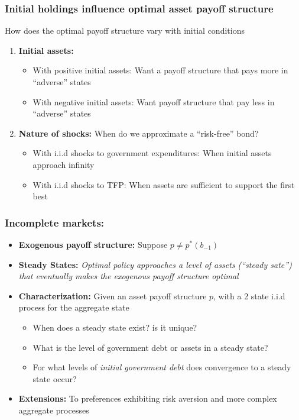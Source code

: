 \documentclass{beamer}
\begin{document}
  \begin{frame}
   \frametitle{Initial holdings influence optimal asset payoff structure}
How does the optimal payoff structure vary with initial conditions
\begin{enumerate}
\item \textbf{Initial assets: }
\begin{itemize}

 \item With positive initial assets: Want a payoff structure that pays more in ``adverse'' states
 \item With negative initial assets: Want payoff structure that pay less in ``adverse'' states
\end{itemize}

 \item \textbf{Nature of shocks: } When do we approximate a ``risk-free'' bond?
 \begin{itemize}
  \item With i.i.d shocks to government expenditures: When initial assets approach  infinity
  \item With i.i.d  shocks to  TFP: When assets are sufficient to support the first best
 \end{itemize}

\end{enumerate}



  \end{frame}


\begin{frame}
	\frametitle{Incomplete markets:}
	\begin{itemize}
		\item  \textbf{Exogenous payoff structure:} Suppose $p\neq p^*(b_{-1})$
		\item \textbf{Steady States: }\emph{Optimal policy approaches a level of assets (``steady
		sate'') that eventually  makes the exogenous payoff structure optimal}
		
		\item \textbf{Characterization: } Given an asset payoff structure $p$, with  a 2 state i.i.d process for the aggregate state
		\begin{itemize}
			\item When does a steady state exist? is it unique?
			\item What is the level of government debt or   assets in a steady state?
			\item For what levels of  \emph{initial government debt} does  convergence to a steady state occur?
 			\end{itemize}
		\item  \textbf{Extensions: } To preferences exhibiting risk aversion and more complex aggregate processes
	\end{itemize}
\end{frame}
\end{document}
